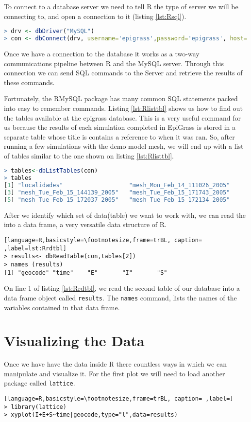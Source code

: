To connect to a database server we need to tell R the type of server we will be connecting to, and open a connection to it (listing \ref{lst:Rsql}). 
\begin{lstlisting}[language=R,basicstyle=\footnotesize,frame=trBL, caption=Specifying the type of server and opening a connection.,label=lst:Rsql]
> drv <- dbDriver("MySQL")
> con <- dbConnect(drv, username='epigrass',password='epigrass', host='localhost',dbname='epigrass')
\end{lstlisting}

Once we have a connection to the database it works as a two-way communications pipeline between R and the MySQL server. Through this connection we can send SQL commands to the Server and retrieve the results of these commands. 

Fortunately, the RMySQL package has many common SQL statements packed into easy to remember commands. Listing \ref{lst:Rlisttbl} shows us how to find out the tables available at the epigrass database. This is a very useful command for us because the results of each simulation completed in EpiGrass is stored in a separate table whose title is contains a reference to when it was ran. So, after running a few simulations with the demo model mesh, we will end up with a list of tables similar to the one shown on listing  \ref{lst:Rlisttbl}.
\begin{lstlisting}[language=R,basicstyle=\footnotesize,frame=trBL, caption=Listing existing tables. ,label=lst:Rlisttbl]
> tables<-dbListTables(con)
> tables
[1] "localidades"                   "mesh_Mon_Feb_14_111026_2005"
[3] "mesh_Tue_Feb_15_144139_2005"   "mesh_Tue_Feb_15_171743_2005"
[5] "mesh_Tue_Feb_15_172037_2005"   "mesh_Tue_Feb_15_172134_2005"
\end{lstlisting}

After we identify which set of data(table) we want to work with, we can read the into a data frame, a very versatile data structure of R.

\begin{lstlisting}[language=R,basicstyle=\footnotesize,frame=trBL, caption= ,label=lst:Rrdtbl]
> results<- dbReadTable(con,tables[2])
> names (results)
[1] "geocode" "time"    "E"       "I"       "S"
\end{lstlisting}

On line 1 of listing \ref{lst:Rrdtbl}, we read the second table of our database into a data frame object called \texttt{results}. The \texttt{names} command, lists the names of the variables contained in that data frame.

\section{Visualizing the Data}
Once we have have the data inside R there countless ways in which we can manipulate and visualize it. For the first plot we will need to load another package called \texttt{lattice}. 
\begin{lstlisting}[language=R,basicstyle=\footnotesize,frame=trBL, caption= ,label=]
> library(lattice)
> xyplot(I+E+S~time|geocode,type="l",data=results)
\end{lstlisting}

